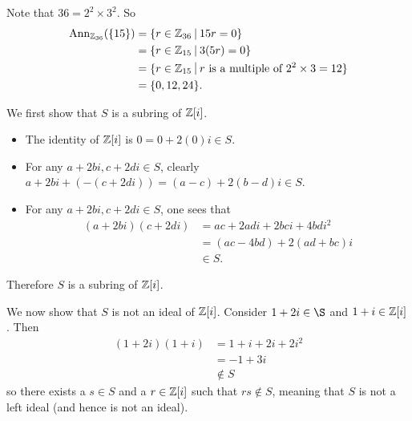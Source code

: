 \begin{questions}
    \item Note that $36 = 2^2 \times 3^2$. So
    \begin{align*}
        \Ann{\Z_{36}}{\{15\}} &= \{r \in \Z_{36} \vert 15r = 0\}\\
        &= \{r \in \Z_{15} \vert 3(5r) = 0\}\\
        &= \{r \in \Z_{15} \vert r \text{ is a multiple of }2^2\times3 = 12\}\\
        &= \{0,12,24\}.
    \end{align*}

    \item We first show that $S$ is a subring of $\mathbb{Z}[i]$.
    \begin{itemize}
        \item The identity of $\mathbb{Z}[i]$ is $0 = 0 + 2(0)i \in S$.
        \item For any $a+2bi, c+2di \in S$, clearly $a+2bi + (-(c + 2di)) = (a-c) + 2(b-d)i \in S$.
        \item For any $a+2bi, c+2di \in S$, one sees that
        \begin{align*}
            (a+2bi)(c+2di) &= ac + 2adi + 2bci + 4bdi^2\\
            &= (ac-4bd) + 2(ad+bc)i\\
            &\in S.
        \end{align*}
    \end{itemize}
    Therefore $S$ is a subring of $\mathbb{Z}[i]$.

    We now show that $S$ is not an ideal of $\mathbb{Z}[i]$. Consider $1+2i \in \S$ and $1+i \in \mathbb{Z}[i]$. Then
    \begin{align*}
        (1+2i)(1+i) &= 1+i+2i+2i^2\\
        &= -1 + 3i\\
        &\notin S
    \end{align*}
    so there exists a $s \in S$ and a $r \in \mathbb{Z}[i]$ such that $rs\notin S$, meaning that $S$ is not a left ideal (and hence is not an ideal).


\end{questions}
